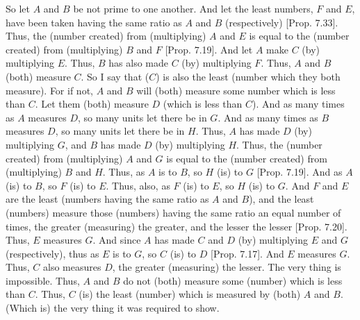 \begin{Parallel}{}{}
{So let $A$ and $B$ be not prime to one another. And let the least numbers,
$F$ and $E$, have been taken having the same ratio as $A$ and $B$ (respectively)
[Prop. 7.33]. Thus, the (number created)
from (multiplying) $A$ and $E$ is equal to the (number created) from (multiplying) $B$ and $F$ [Prop. 7.19].
And let $A$ make $C$ (by) multiplying $E$. Thus, $B$ has also made $C$
(by) multiplying $F$. Thus, $A$ and $B$ (both) measure $C$. So I say that
($C$) is also the least (number which they both measure). For if not, 
$A$ and $B$ will (both) measure some number which is less than $C$. Let them
(both) measure $D$ 
(which is less than $C$). And as many times as $A$ measures $D$, so many units
let there be in $G$.
And as many times as $B$ measures $D$,
so many units let there be in $H$. Thus, $A$ has made $D$ (by) multiplying $G$, and $B$
has made $D$ (by) multiplying $H$. Thus, the (number created) from (multiplying) $A$ and $G$ is equal to the (number created)
from (multiplying) $B$ and $H$. Thus, as $A$ is to $B$, so $H$ (is) to $G$ [Prop. 7.19]. And as $A$ (is) to $B$, so $F$ (is) to $E$.
Thus, also, as $F$ (is) to $E$, so $H$ (is) to $G$. And $F$ and $E$ are the least
(numbers having the same ratio as $A$ and $B$), and the least (numbers) measure
those (numbers) having the same ratio an equal number of times, the
greater (measuring) the greater, and the lesser the lesser [Prop. 7.20]. Thus, $E$ measures $G$. And since $A$
has made $C$ and $D$ (by) multiplying $E$ and $G$ (respectively), thus as
$E$ is to $G$, so $C$ (is) to $D$ [Prop. 7.17].
And $E$ measures $G$. Thus, $C$ also measures $D$, the greater (measuring) the
lesser. The very thing is impossible. Thus, $A$ and $B$ do not (both) measure some (number) which is less than $C$. Thus, $C$ (is) the least (number) which is measured by (both) $A$
and $B$. (Which is) the very thing it was required to show.}
\end{Parallel}

